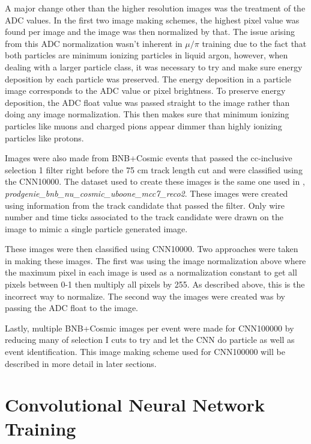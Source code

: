 A major change other than the higher resolution images was the treatment of the ADC values. In the first two image making schemes, the highest pixel value was found per image and the image was then normalized by that. The issue arising from this ADC normalization wasn't inherent in $\mu/\pi$ training due to the fact that both particles are minimum ionizing particles in liquid argon, however, when dealing with a larger particle class, it was necessary to try and make sure energy deposition by each particle was preserved. The energy deposition in a particle image corresponds to the ADC value or pixel brightness. To preserve energy deposition, the ADC float value was passed straight to the image rather than doing any image normalization. This then makes sure that minimum ionizing particles like muons and charged pions appear dimmer than highly ionizing particles like protons.  

Images were also made from BNB+Cosmic events that passed the cc-inclusive selection 1 filter right before the 75 cm track length cut and were classified using the CNN10000. The dataset used to create these images is the same one used in \cite{cc-inclusive}, \textit{prodgenie{\_}bnb{\_}nu{\_}cosmic{\_}uboone{\_}mcc7{\_}reco2}. These images were created using information from the track candidate that passed the filter. Only wire number and time ticks associated to the track candidate were drawn on the image to mimic a single particle generated image. 

These images were then classified using CNN10000. Two approaches were taken in making these images. The first was using the image normalization above where the maximum pixel in each image is used as a normalization constant to get all pixels between 0-1 then multiply all pixels by 255. As described above, this is the incorrect way to normalize. The second way the images were created was by passing the ADC float to the image. 

Lastly, multiple BNB+Cosmic images per event were made for CNN100000 by reducing many of selection I cuts to try and let the CNN do particle as well as event identification. This image making scheme used for CNN100000 will be described in more detail in later sections. 

\section{Convolutional Neural Network Training}
